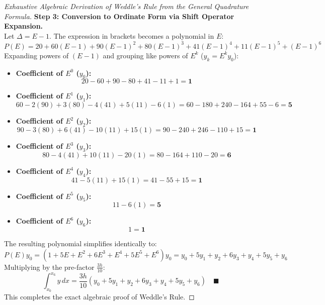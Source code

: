 \begin{proof}[Exhaustive Algebraic Derivation of Weddle's Rule from the General Quadrature Formula]
\medskip
\noindent\textbf{Step 3: Conversion to Ordinate Form via Shift Operator Expansion.} \\
Let $\Delta = E - 1$. The expression in brackets becomes a polynomial in $E$:
\begin{equation}
    P(E) = 20 + 60(E-1) + 90(E-1)^2 + 80(E-1)^3 + 41(E-1)^4 + 11(E-1)^5 + (E-1)^6
\end{equation}
Expanding powers of $(E-1)$ and grouping like powers of $E^k$ ($y_k = E^k y_0$):
\begin{itemize}[noitemsep]
    \item \textbf{Coefficient of $E^0$ ($y_0$):}
    \begin{equation}
        20 - 60 + 90 - 80 + 41 - 11 + 1 = \mathbf{1}
    \end{equation}
    \item \textbf{Coefficient of $E^1$ ($y_1$):}
    \begin{equation}
        60 - 2(90) + 3(80) - 4(41) + 5(11) - 6(1) = 60 - 180 + 240 - 164 + 55 - 6 = \mathbf{5}
    \end{equation}
    \item \textbf{Coefficient of $E^2$ ($y_2$):}
    \begin{equation}
        90 - 3(80) + 6(41) - 10(11) + 15(1) = 90 - 240 + 246 - 110 + 15 = \mathbf{1}
    \end{equation}
    \item \textbf{Coefficient of $E^3$ ($y_3$):}
    \begin{equation}
        80 - 4(41) + 10(11) - 20(1) = 80 - 164 + 110 - 20 = \mathbf{6}
    \end{equation}
    \item \textbf{Coefficient of $E^4$ ($y_4$):}
    \begin{equation}
        41 - 5(11) + 15(1) = 41 - 55 + 15 = \mathbf{1}
    \end{equation}
    \item \textbf{Coefficient of $E^5$ ($y_5$):}
    \begin{equation}
        11 - 6(1) = \mathbf{5}
    \end{equation}
    \item \textbf{Coefficient of $E^6$ ($y_6$):}
    \begin{equation}
        1 = \mathbf{1}
    \end{equation}
\end{itemize}
The resulting polynomial simplifies identically to:
\begin{equation}
    P(E) y_0 = \left( 1 + 5 E + E^2 + 6 E^3 + E^4 + 5 E^5 + E^6 \right) y_0 = y_0 + 5 y_1 + y_2 + 6 y_3 + y_4 + 5 y_5 + y_6
\end{equation}
Multiplying by the pre-factor $\frac{3 h}{10}$:
\begin{equation}
    \boxed{\int_{x_0}^{x_6} y \, dx = \frac{3 h}{10} \left( y_0 + 5 y_1 + y_2 + 6 y_3 + y_4 + 5 y_5 + y_6 \right)} \quad \blacksquare
\end{equation}
This completes the exact algebraic proof of Weddle's Rule.
\end{proof}

